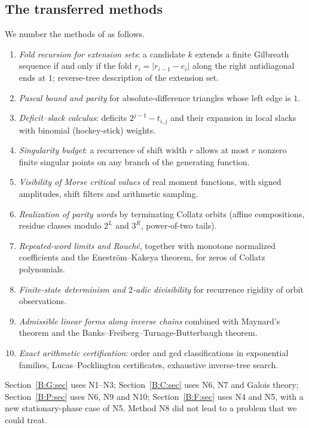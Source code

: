 \documentclass[11pt,a4paper]{article}
\theoremstyle{definition}
\theoremstyle{remark}
\numberwithin{equation}{section}
\begin{document}
\subsection{The transferred methods}\label{B:sec:methods}
We number the methods of \cite{R021} as follows.
\begin{enumerate}
\item[N1.] \emph{Fold recursion for extension sets}: a candidate $k$ extends a
finite Gilbreath sequence if and only if the fold $r_i=|r_{i-1}-e_i|$ along the
right antidiagonal ends at $1$; reverse-tree description of the extension set.
\item[N2.] \emph{Pascal bound and parity} for absolute-difference triangles
whose left edge is $1$.
\item[N3.] \emph{Deficit--slack calculus}: deficits $2^{j-1}-t_{i,j}$ and their
expansion in local slacks with binomial (hockey-stick) weights.
\item[N4.] \emph{Singularity budget}: a recurrence of shift width $r$ allows at
most $r$ nonzero finite singular points on any branch of the generating
function.
\item[N5.] \emph{Visibility of Morse critical values} of real moment functions,
with signed amplitudes, shift filters and arithmetic sampling.
\item[N6.] \emph{Realization of parity words} by terminating Collatz orbits
(affine compositions, residue classes modulo $2^L$ and $3^R$, power-of-two
tails).
\item[N7.] \emph{Repeated-word limits and Rouch\'e}, together with
monotone normalized coefficients and the Enestr\"om--Kakeya theorem, for zeros
of Collatz polynomials.
\item[N8.] \emph{Finite-state determinism and $2$-adic divisibility} for
recurrence rigidity of orbit observations.
\item[N9.] \emph{Admissible linear forms along inverse chains} combined with
Maynard's theorem and the Banks--Freiberg--Turnage-Butterbaugh theorem.
\item[N10.] \emph{Exact arithmetic certification}: order and gcd classifications
in exponential families, Lucas--Pocklington certificates, exhaustive inverse-tree
search.
\end{enumerate}
Section~\ref{B:G:sec} uses N1--N3; Section~\ref{B:C:sec} uses N6, N7 and Galois
theory; Section~\ref{B:P:sec} uses N6, N9 and N10; Section~\ref{B:F:sec} uses N4
and N5, with a new stationary-phase case of N5. Method N8 did not lead to a
problem that we could treat.
\end{document}
